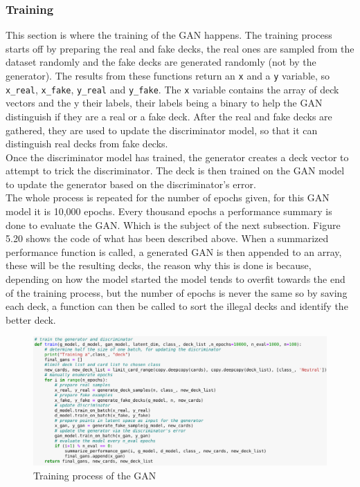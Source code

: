 \documentclass{report} %
\begin{document}
\subsubsection{Training}
This section is where the training of the GAN happens. The training process starts off by preparing the real and fake decks, the real ones are sampled from the dataset randomly and the fake decks are generated randomly (not by the generator). The results from these functions return an \texttt{x} and a \texttt{y} variable, so \nolinkurl{x_real}, \nolinkurl{x_fake}, \nolinkurl{y_real} and \nolinkurl{y_fake}. The \texttt{x} variable contains the array of deck vectors and the y their labels, their labels being a binary to help the GAN distinguish if they are a real or a fake deck. After the real and fake decks are gathered, they are used to update the discriminator model, so that it can distinguish real decks from fake decks. \\
Once the discriminator model has trained, the generator creates a deck vector to attempt to trick the discriminator. The deck is then trained on the GAN model to update the generator based on the discriminator's error.  \\
The whole process is repeated for the number of epochs given, for this GAN model it is 10,000 epochs. Every thousand epochs a performance summary is done to evaluate the GAN. Which is the subject of the next subsection. Figure 5.20 shows the code of what has been described above. When a summarized performance function is called, a generated GAN is then appended to an array, these will be the resulting decks, the reason why this is done is because, depending on how the model started the model tends to overfit towards the end of the training process, but the number of epochs is never the same so by saving each deck, a function can then be called to sort the illegal decks and identify the better deck.

\begin{figure}[H]
\centering
\includegraphics[width=1.25\textwidth]{train}
\caption{Training process of the GAN\protect}
\label{board}
\end{figure}
\end{document}
